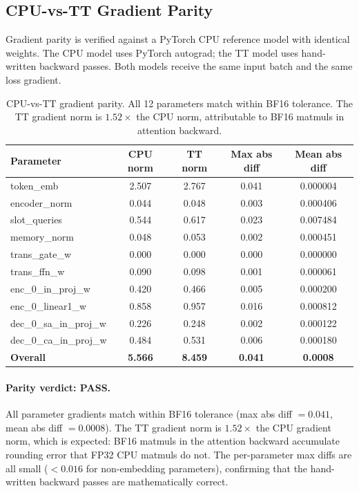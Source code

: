 \documentclass[11pt,a4paper]{article}
\begin{document}
\subsection{CPU-vs-TT Gradient Parity}

Gradient parity is verified against a PyTorch CPU reference model with identical weights. The CPU model uses PyTorch autograd; the TT model uses hand-written backward passes. Both models receive the same input batch and the same loss gradient.

\begin{table}[h]
\centering
\small
\begin{tabularx}{\textwidth}{l c c c c}
\toprule
\textbf{Parameter} & \textbf{CPU norm} & \textbf{TT norm} & \textbf{Max abs diff} & \textbf{Mean abs diff} \\
\midrule
token\_emb        & 2.507 & 2.767 & 0.041 & 0.000004 \\
encoder\_norm     & 0.044 & 0.048 & 0.003 & 0.000406 \\
slot\_queries     & 0.544 & 0.617 & 0.023 & 0.007484 \\
memory\_norm      & 0.048 & 0.053 & 0.002 & 0.000451 \\
trans\_gate\_w    & 0.000 & 0.000 & 0.000 & 0.000000 \\
trans\_ffn\_w     & 0.090 & 0.098 & 0.001 & 0.000061 \\
enc\_0\_in\_proj\_w & 0.420 & 0.466 & 0.005 & 0.000200 \\
enc\_0\_linear1\_w & 0.858 & 0.957 & 0.016 & 0.000812 \\
dec\_0\_sa\_in\_proj\_w & 0.226 & 0.248 & 0.002 & 0.000122 \\
dec\_0\_ca\_in\_proj\_w & 0.484 & 0.531 & 0.006 & 0.000180 \\
\midrule
\textbf{Overall}  & \textbf{5.566} & \textbf{8.459} & \textbf{0.041} & \textbf{0.0008} \\
\bottomrule
\end{tabularx}
\caption{CPU-vs-TT gradient parity. All 12 parameters match within BF16 tolerance. The TT gradient norm is $1.52\times$ the CPU norm, attributable to BF16 matmuls in attention backward.}
\label{tab:parity}
\end{table}

\paragraph{Parity verdict: PASS.}
All parameter gradients match within BF16 tolerance (max abs diff $= 0.041$, mean abs diff $= 0.0008$). The TT gradient norm is $1.52\times$ the CPU gradient norm, which is expected: BF16 matmuls in the attention backward accumulate rounding error that FP32 CPU matmuls do not. The per-parameter max diffs are all small ($< 0.016$ for non-embedding parameters), confirming that the hand-written backward passes are mathematically correct.
\end{document}
